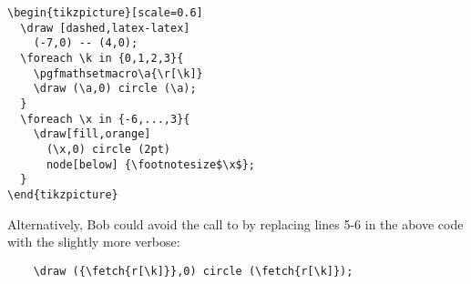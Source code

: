 \documentclass{article}
\begin{document}
\begin{codebox}
\begin{verbatim}
\begin{tikzpicture}[scale=0.6]
  \draw [dashed,latex-latex]
    (-7,0) -- (4,0);
  \foreach \k in {0,1,2,3}{
    \pgfmathsetmacro\a{\r[\k]}
    \draw (\a,0) circle (\a);
  }
  \foreach \x in {-6,...,3}{
    \draw[fill,orange]
      (\x,0) circle (2pt)
      node[below] {\footnotesize$\x$};
  }
\end{tikzpicture}
\end{verbatim}
    \tcblower
    \begin{center}
\end{center}
\end{codebox}

Alternatively, Bob could avoid the call to \texttt{\pgfmathsetmacro} by replacing lines 5-6 in the above code with the slightly more verbose:

\begin{verbatim}
    \draw ({\fetch{r[\k]}},0) circle (\fetch{r[\k]});
\end{verbatim}
\end{document}
